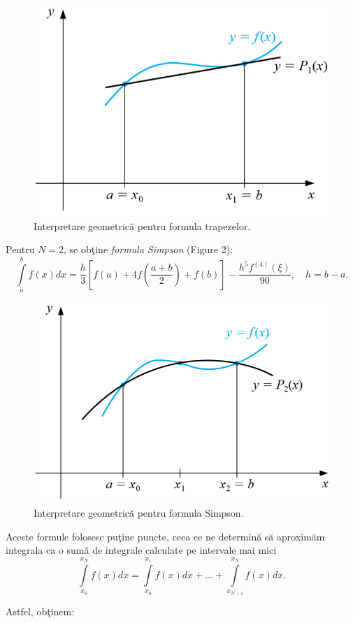 \documentclass{exam}
\begin{document}
\begin{figure}[ht]

	\begin{center}
		\includegraphics[width=0.5\columnwidth]{./img/trapez}
		\caption{Interpretare geometrică pentru formula trapezelor.}
	\end{center}
\end{figure}


Pentru $N=2$, se ob\c{t}ine \textit{formula Simpson} (Figure 2):
$$\int\limits_{a}^{b}f(x)dx=\frac{h}{3}\left[f(a)+4f\left(\frac{a+b}{2}\right)+f(b)\right]-\frac{h^5f^{(4)}(\xi)}{90}, \quad h=b-a.$$

\begin{figure}[ht]

	\begin{center}
		\includegraphics[width=0.5\columnwidth]{./img/simpson}
		\caption{Interpretare geometrică pentru formula Simpson.}
	\end{center}
\end{figure}
Aceste formule folosesc pu\c{t}ine puncte, ceea ce ne determin\u{a} s\u{a} aproxim\u{a}m integrala ca o sum\u{a} de integrale calculate pe intervale mai mici
$$\int\limits_{x_0}^{x_N}f(x)dx=\int\limits_{x_0}^{x_1}f(x)dx+...+\int\limits_{x_{N-1}}^{x_{N}}f(x)dx.$$

Astfel, ob\c{t}inem:
\end{document}
